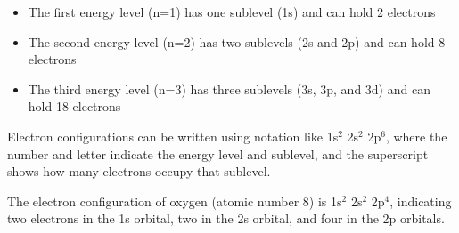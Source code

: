 \begin{itemize}
    \item The first energy level (n=1) has one sublevel (1s) and can hold 2 electrons
    \item The second energy level (n=2) has two sublevels (2s and 2p) and can hold 8 electrons
    \item The third energy level (n=3) has three sublevels (3s, 3p, and 3d) and can hold 18 electrons
\end{itemize}

Electron configurations can be written using notation like 1s$^2$ 2s$^2$ 2p$^6$, where the number and letter indicate the energy level and sublevel, and the superscript shows how many electrons occupy that sublevel.

\begin{example}
The electron configuration of oxygen (atomic number 8) is 1s$^2$ 2s$^2$ 2p$^4$, indicating two electrons in the 1s orbital, two in the 2s orbital, and four in the 2p orbitals.
\end{example}


